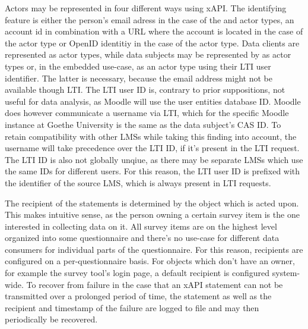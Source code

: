     Actors may be represented in four different ways using xAPI. 
    The identifying feature is either the person's email adress in the case
    of the  and  actor types, an account id 
    in combination with a URL where the account is located in the case of the 
     actor type
    or OpenID identitiy in the case of the  actor type.
    Data clients are represented as  actor types, while data subjects may 
    be represented by as  actor types
    or, in the embedded use-case, as an  actor type using their
    LTI user identifier. The latter is necessary, because the email address might not be available
    though LTI. The LTI user ID is, contrary to prior suppositions, not
    useful for data analysis, as Moodle will use the user entities database ID.
    Moodle does however communicate a username via LTI, which for the specific Moodle instance
    at Goethe University is the same as the data subject's CAS ID.
    To retain compatibility with other LMSs while taking this finding into account,
    the username will take precedence over the LTI ID, if it's present in the LTI request.
    The LTI ID is also not globally unqiue, as there may be separate LMSs which
    use the same IDs for different users. For this reason, the LTI user ID is
    prefixed with the identifier of the source LMS, which is always present in LTI requests.

    The recipient of the statements is determined by the object which is acted upon. 
    This makes intuitive sense, as the person owning a certain survey item is the one interested in
    collecting data on it. All survey items are on the highest level
    organized into some questionnaire and there's no use-case for different
    data consumers for individual parts of the questionnaire. 
    For this reason, recipients are configured on a per-questionnaire basis.
    For objects which don't have an owner, for example the survey tool's login
    page, a default recipient is configured system-wide.
    To recover from failure in the case that an xAPI statement
    can not be transmitted over a prolonged period of time, the
    statement as well as the recipient and timestamp of the failure
    are logged to file and may then periodically be recovered.

